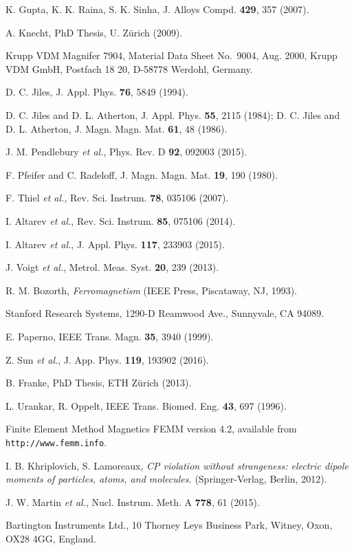 \documentclass[review]{elsarticle}
\begin{document}
\begin{thebibliography}{00}
 K. Gupta, K. K. Raina, S. K. Sinha, J. Alloys
  Compd. {\bf 429}, 357 (2007).

 A. Knecht, PhD Thesis, U. Z\"urich (2009).

 Krupp VDM Magnifer 7904, Material Data Sheet
  No.~9004, Aug. 2000, Krupp VDM GmbH, Postfach 18 20, D-58778
  Werdohl, Germany.

 D. C. Jiles, J. Appl. Phys. {\bf 76}, 5849 (1994).

 D. C. Jiles and D. L. Atherton,
  J. Appl. Phys. {\bf 55}, 2115 (1984); D. C. Jiles and D. L. Atherton,
  J. Magn. Magn. Mat. {\bf 61}, 48 (1986).

 J. M. Pendlebury {\it et al.}, Phys. Rev. D {\bf 92}, 092003 (2015).

 F. Pfeifer and C. Radeloff,
  J. Magn. Magn. Mat. {\bf 19}, 190 (1980).

 F. Thiel {\it et al.}, Rev. Sci. Instrum. {\bf 78}, 035106 (2007).

 I. Altarev {\it et al.},
  Rev. Sci. Instrum. {\bf 85}, 075106 (2014).

 I. Altarev {\it et al.}, J. Appl. Phys. {\bf 117}, 233903 (2015).

 J. Voigt {\it et al.}, Metrol. Meas. Syst. {\bf 20}, 239 (2013).

 R. M. Bozorth, {\it Ferromagnetism} (IEEE Press,
  Piscataway, NJ, 1993).

 Stanford Research Systems, 1290-D Reamwood Ave.,
  Sunnyvale, CA 94089.

 E. Paperno, IEEE Trans. Magn. {\bf
  35}, 3940 (1999).

 Z. Sun {\it et al.}, J. App. Phys. {\bf
  119}, 193902 (2016).

 B. Franke, PhD Thesis, ETH Z\"urich (2013).

 L. Urankar, R. Oppelt, IEEE
  Trans. Biomed. Eng. {\bf 43}, 697 (1996).

 Finite Element Method Magnetics FEMM version 4.2,
  available from {\tt http://www.femm.info}.

 I. B. Khriplovich,
  S. Lamoreaux, {\it CP violation without strangeness: electric dipole
    moments of particles, atoms, and molecules.} (Springer-Verlag,
  Berlin, 2012).

 J. W. Martin {\it et al.},
  Nucl. Instrum. Meth. A {\bf 778}, 61 (2015).

 Bartington Instruments Ltd., 10 Thorney Leys
  Business Park, Witney, Oxon, OX28 4GG, England.

\end{thebibliography}
\end{document}
